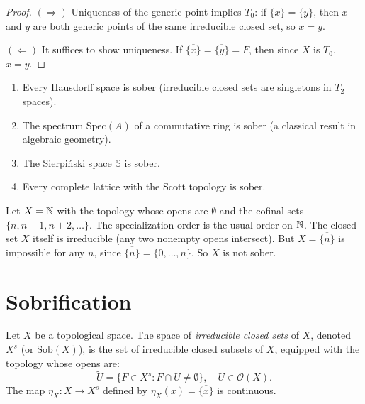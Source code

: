 \begin{proof}
$(\Rightarrow)$ Uniqueness of the generic point implies $T_0$: if
$\overline{\{x\}} = \overline{\{y\}}$, then $x$ and $y$ are both generic points of the
same irreducible closed set, so $x = y$.

$(\Leftarrow)$ It suffices to show uniqueness. If $\overline{\{x\}} = \overline{\{y\}} = F$,
then since $X$ is $T_0$, $x = y$.
\end{proof}

\begin{example}
\begin{enumerate}
  \item Every Hausdorff space is sober (irreducible closed sets are singletons in $T_2$
    spaces).
  \item The spectrum $\mathrm{Spec}(A)$ of a commutative ring is sober (a classical result
    in algebraic geometry).
  \item The Sierpi\'nski space $\mathbb{S}$ is sober.
  \item Every complete lattice with the Scott topology is sober.
\end{enumerate}
\end{example}

\begin{example}
Let $X = \mathbb{N}$ with the topology whose opens are $\emptyset$ and the cofinal sets
$\{n, n+1, n+2, \ldots\}$. The specialization order is the usual order on $\mathbb{N}$. The closed
set $X$ itself is irreducible (any two nonempty opens intersect). But
$X = \overline{\{n\}}$ is impossible for any $n$, since $\overline{\{n\}} = \{0,\ldots,n\}$.
So $X$ is not sober.
\end{example}

\section{Sobrification}

\begin{definition}[Sobrification]
Let $X$ be a topological space. The space of \emph{irreducible closed sets} of $X$,
denoted $X^s$ (or $\mathrm{Sob}(X)$), is the set of irreducible closed subsets of $X$,
equipped with the topology whose opens are:
\[
  \tilde{U} = \{F \in X^s : F \cap U \neq \emptyset\}, \quad U \in \mathcal{O}(X).
\]
The map $\eta_X\colon X \to X^s$ defined by $\eta_X(x) = \overline{\{x\}}$ is continuous.
\end{definition}


